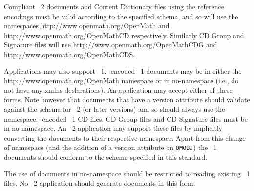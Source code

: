 Compliant \OM~2 documents and Content Dictionary files using the reference \XML encodings
must be valid according to the specified schema, and so will use the namespaces
\url{http://www.openmath.org/OpenMath} and \url{http://www.openmath.org/OpenMathCD}
respectively. Similarly CD Group and Signature files will use
\url{http://www.openmath.org/OpenMathCDG} and \url{http://www.openmath.org/OpenMathCDS}.

Applications may also support \OM~1.  \XML-encoded \OM~1 documents may be in either the
\url{http://www.openmath.org/OpenMath} namespace or in no-namespace (i.e., do not
have any xmlns declarations).  An application may accept either of these forms. Note
however that \OM documents that have a version attribute should validate against the
schema for \OM~2 (or later versions) and so should always use the \OM namespace.
\XML-encoded \OM~1 CD files, CD Group files and CD Signature files must be in
no-namespace. An \OM~2 application may support these files by implicitly converting the
documents to their respective namespace. Apart from this change of namespace (and the
addition of a version attribute on \lstinline|OMOBJ|) the \OM~1 documents should conform
to the schema specified in this standard.

The use of documents in no-namespace should be restricted to reading existing \OM~1 files.
No \OM~2 application should generate documents in this form.

